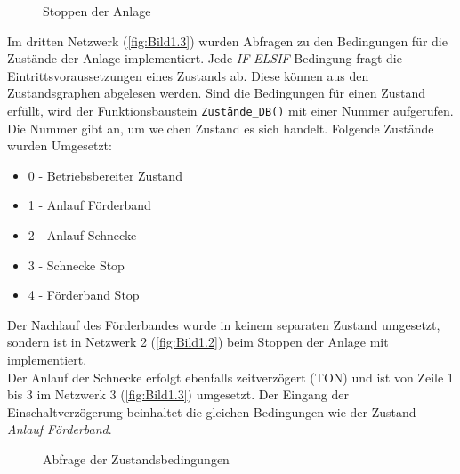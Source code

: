 \begin{figure}[H]
   \centering
   \caption[Stoppen der Anlage]{Stoppen der Anlage}
   \label{fig:Bild1.2}
\end{figure}

Im dritten Netzwerk (\autoref{fig:Bild1.3}) wurden Abfragen zu den Bedingungen für die Zustände der Anlage implementiert. Jede \textit{IF} \bzw \textit{ELSIF}-Bedingung fragt die Eintrittsvoraussetzungen eines Zustands ab. Diese können aus den Zustandsgraphen abgelesen werden. Sind die Bedingungen für einen Zustand erfüllt, wird der Funktionsbaustein \texttt{Zustände_DB()} mit einer Nummer aufgerufen. Die Nummer gibt an, um welchen Zustand es sich handelt. Folgende Zustände wurden Umgesetzt:

\begin{itemize}
    \item 0 - Betriebsbereiter Zustand
    \item 1 - Anlauf Förderband
    \item 2 - Anlauf Schnecke
    \item 3 - Schnecke Stop
    \item 4 - Förderband Stop
\end{itemize}

Der Nachlauf des Förderbandes wurde in keinem separaten Zustand umgesetzt, sondern ist in Netzwerk 2 (\autoref{fig:Bild1.2}) beim Stoppen der Anlage mit implementiert. \\
Der Anlauf der Schnecke erfolgt ebenfalls zeitverzögert (TON) und ist von Zeile 1 bis 3 im Netzwerk 3 (\autoref{fig:Bild1.3}) umgesetzt. Der Eingang der Einschaltverzögerung beinhaltet die gleichen Bedingungen wie der Zustand \textit{\glqq Anlauf Förderband\grqq{}}.

\begin{figure}[H]
   \centering
   \caption[Abfrage der Zustandsbedingungen]{Abfrage der Zustandsbedingungen}
   \label{fig:Bild1.3}
\end{figure}

